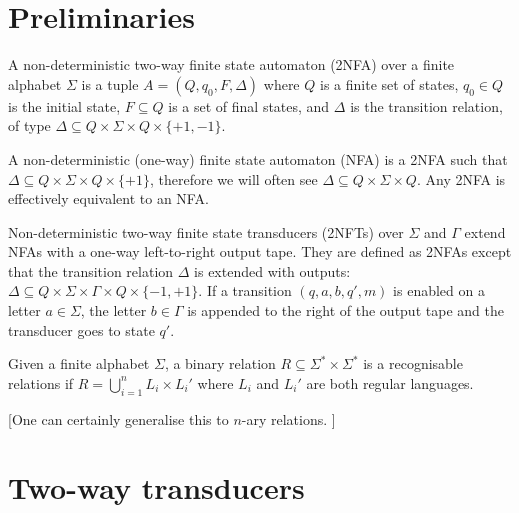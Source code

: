 \documentclass{llncs}
\newcommand{\tl}[1]{\color{blue} {TL: #1 :LT} \color{black}}
\newcommand{\tl}[1]{}
\begin{document}
\section{Preliminaries}

\begin{definition}
A non-deterministic two-way finite state automaton 
(2NFA) over a finite alphabet $\Sigma$ is a tuple $A =
(Q, q_0, F, \Delta)$ where $Q$ is a finite set of states, $q_0\in Q$ is
the initial state, $F\subseteq Q$ is a set of final states, and $\Delta$ is the
transition relation, of type $\Delta\subseteq Q \times \Sigma\times Q \times \{+1, -1\}$. 

A non-deterministic (one-way) finite state automaton (NFA)
is a 2NFA such that $\Delta\subseteq Q \times \Sigma\times Q \times \{+1\}$, therefore we
will often see $\Delta\subseteq Q \times \Sigma \times Q$. Any 2NFA is
effectively equivalent to an NFA.  
\end{definition}


\begin{definition}
  Non-deterministic two-way finite state transducers (2NFTs) over $\Sigma$ and $\Gamma$ extend NFAs with a one-way left-to-right output tape. They are defined as 2NFAs except that the transition relation $\Delta$ is extended with outputs: $\Delta\subseteq Q \times \Sigma \times \Gamma \times  Q \times \{-1, +1\}$. If a transition $(q, a, b, q′, m)$ is enabled on a letter $a\in \Sigma$, the letter $b\in \Gamma$ is appended to the right of
	the output tape and the transducer goes to state $q'$. 
\end{definition}




\begin{definition}
	Given a finite alphabet $\Sigma$, a binary relation $R\subseteq \Sigma^*\times \Sigma^*$ is a recognisable relations if $R=\bigcup_{i=1}^n L_i\times L_i'$ where $L_i$ and $L_i'$ are both regular languages. 
	
	[One can certainly generalise this to $n$-ary relations. ]
\end{definition}




\section{Two-way transducers}
\end{document}
